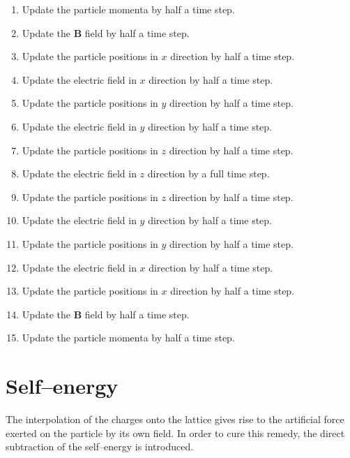\documentclass[a4paper, 12pt]{article}
\newcommand{\vect}[1]{\mathbf{#1}}
\begin{document}
\begin{enumerate}
\begin{enumerate}
\item Update the particle momenta by half a time step.
\item Update the $\vect B$ field by half a time step.
\item Update the particle positions in $x$ direction by half a time step.
\item Update the electric field in $x$ direction by half a time step.
\item Update the particle positions in $y$ direction by half a time step.
\item Update the electric field in $y$ direction by half a time step.
\item Update the particle positions in $z$ direction by half a time step.
\item Update the electric field in $z$ direction by a full time step.
\item Update the particle positions in $z$ direction by half a time step.
\item Update the electric field in $y$ direction by half a time step.
\item Update the particle positions in $y$ direction by half a time step.
\item Update the electric field in $x$ direction by half a time step.
\item Update the particle positions in $x$ direction by half a time step.
\item Update the $\vect B$ field by half a time step.
\item Update the particle momenta by half a time step.
\end{enumerate}
%
\section{Self--energy}
%
The interpolation of the charges onto the lattice gives rise to the
artificial force exerted on the particle by its own field. In order to
cure this remedy, the direct subtraction of the self--energy is introduced.


\end{enumerate}
\end{document}
